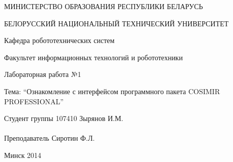 \begin{titlepage} %

\thispagestyle{empty} %

\begin{center}
МИНИСТЕРСТВО ОБРАЗОВАНИЯ РЕСПУБЛИКИ БЕЛАРУСЬ

БЕЛОРУССКИЙ НАЦИОНАЛЬНЫЙ ТЕХНИЧЕСКИЙ УНИВЕРСИТЕТ

Кафедра робототехнических систем

Факультет информационных технологий и робототехники
\end{center}

\vfill

\begin{center}
Лабораторная работа №1

Тема: ``Ознакомление с интерфейсом программного пакета COSIMIR PROFESSIONAL''
\end{center}

\vfill

\noindent
Студент группы 107410 \hfill Зырянов И.М.
\\
\\
\noindent
Преподаватель \hfill Сиротин Ф.Л.

\vfill

\centerline{Минск 2014}

\clearpage %

\end{titlepage}

\setcounter{page}{2}